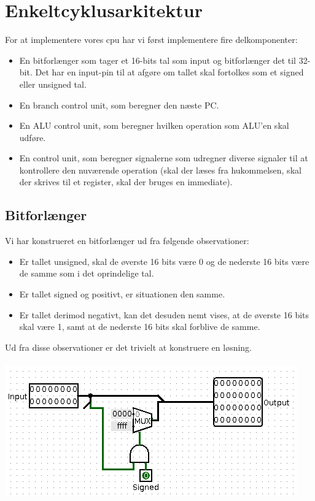 \section{Enkeltcyklusarkitektur}
For at implementere vores cpu har vi først implementere fire delkomponenter:
\begin{itemize}
\item En bitforlænger som tager et 16-bits tal som input og bitforlænger det til
32-bit. Det har en input-pin til at afgøre om tallet skal fortolkes som et
signed eller unsigned tal.
\item En branch control unit, som beregner den næste PC.
\item En ALU control unit, som beregner hvilken operation som ALU'en skal udføre.
\item En control unit, som beregner signalerne som udregner diverse signaler til
at kontrollere den nuværende operation (skal der læses fra hukommelsen, skal der
skrives til et register, skal der bruges en immediate).
\end{itemize}

\subsection{Bitforlænger}
Vi har konstrueret en bitforlænger ud fra følgende observationer:
\begin{itemize}
\item Er tallet unsigned, skal de øverste 16 bits være 0 og de nederste 16 bits
være de samme som i det oprindelige tal.
\item Er tallet signed og positivt, er situationen den samme.
\item Er tallet derimod negativt, kan det desuden nemt vises, at de øverste 16
bits skal være 1, samt at de nederste 16 bits skal forblive de samme.
\end{itemize}

Ud fra disse observationer er det trivielt at konstruere en løsning.\\
\\
\includegraphics{Billeder/single_cycle_bit_extender.png}

